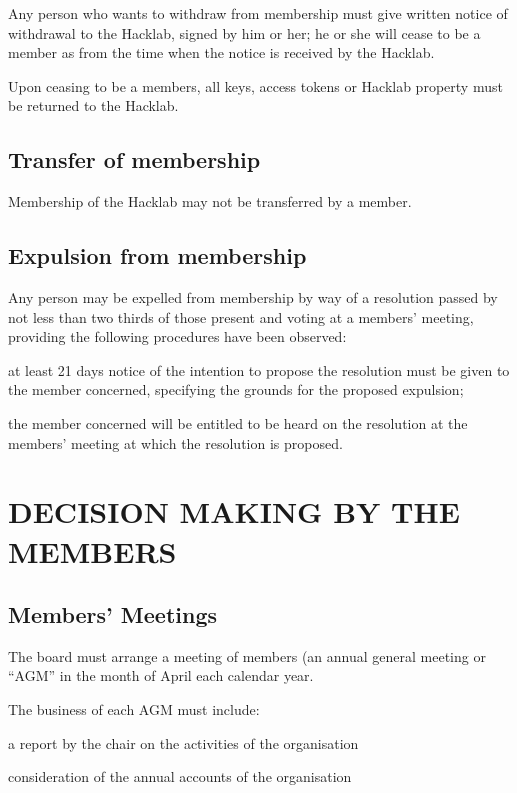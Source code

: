 \documentclass{article}
\begin{document}
\clause Any person who wants to withdraw from membership must give
written notice of withdrawal to the Hacklab, signed by him or her; he
or she will cease to be a member as from the time when the notice is
received by the Hacklab.

\clause Upon ceasing to be a members, all keys, access tokens or
Hacklab property must be returned to the Hacklab.

\subsection{Transfer of  membership}

\clause Membership of the Hacklab may not be transferred by a member.

\subsection{Expulsion from membership}

\clause Any person may be expelled from membership by way of a
resolution passed by not less than two thirds of those present and
voting at a members' meeting, providing the following procedures have
been observed:

\subclause at least 21 days notice of the intention to propose the
resolution must be given to the member concerned, specifying the
grounds for the proposed expulsion;

\subclause the member concerned will be entitled to be heard on the
resolution at the members' meeting at which the resolution is
proposed.

\section {DECISION MAKING BY THE MEMBERS}

\subsection{Members' Meetings}

\clause The board must arrange a meeting of members (an annual general
meeting or ``AGM'' in the month of April each calendar year.

\clause The business of each AGM must include:

\subclause a report by the chair on the activities of the organisation

\subclause consideration of the annual accounts of the organisation
\end{document}
